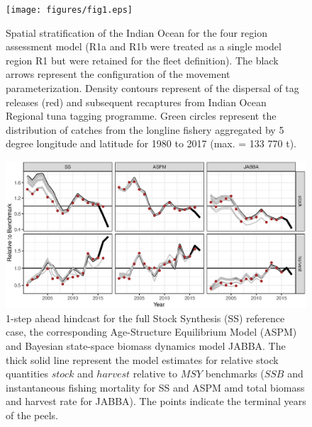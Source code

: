 \documentclass[12pt,halfline,a4paper,nonumbib]{ouparticle}
\begin{document}
\begin{figure}[!ht]
\centering
\texttt{[image: figures/fig1.eps]}
\caption{Spatial stratification of the Indian Ocean for the four region assessment model (R1a and R1b were treated as a single model region R1 but were retained for the fleet definition). The black arrows represent the configuration of the movement parameterization.  Density contours represent of the dispersal of tag releases (red) and subsequent recaptures from Indian Ocean Regional tuna tagging programme. Green circles represent the distribution of catches from the longline fishery aggregated by 5 degree longitude and latitude for 1980 to 2017 (max. = 133 770 t).}
\label{fig:map}
\end{figure}


\begin{figure}
\includegraphics[width=6in]{fig2.eps}
\caption{1-step ahead hindcast for the full Stock Synthesis (SS) reference case, the corresponding Age-Structure Equilibrium Model (ASPM) and Bayesian state-space biomass dynamics model JABBA.  The thick solid line represent the model estimates for relative stock quantities $stock$ and $harvest$ relative to $MSY$ benchmarks ($SSB$ and instantaneous fishing mortality for SS and ASPM amd total biomass and harvest rate for JABBA). The points indicate the terminal years of the peels.}\label{fig:fig2}
\end{figure}
\end{document}
